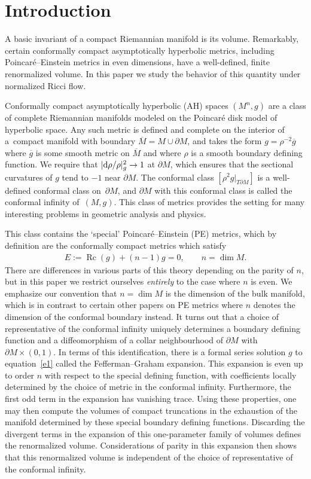 \documentclass[pdftex]{sigma}
\numberwithin{equation}{section}
\newcommand{\del}{\partial}
\newcommand{\gbar}{\overline{g}}
\newcommand{\Mbar}{\overline{M}}
\DeclareMathOperator{\Rc}{Rc}
\begin{document}

\section{Introduction}

A basic invariant of a compact Riemannian manifold is its volume. Remarkably, certain conformally compact
asymptotically hyperbolic metrics, including Poincar\'e--Einstein metrics in even dimensions, have a well-defined,
finite renormalized volume. In this paper we study the behavior of this quantity under normalized Ricci flow.

Conformally compact asymptotically hyperbolic (AH) spaces $(M^n, g)$ are a class of complete Riemannian manifolds modeled on the Poincar\'e disk model of hyperbolic space. Any such metric is defined and complete on the interior of a~compact manifold with boundary $\Mbar = M \cup \partial M$, and takes the form $g = \rho^{-2} \gbar$ where $\gbar$ is some smooth metric on $\Mbar$ and where $\rho$ is a smooth boundary defining function. We require that $|{\rm d}\rho/\rho|^2_g \to 1$ at $\partial M$, which ensures that the sectional curvatures of $g$ tend to $-1$ near $\partial M$. The conformal class $[\rho^2 g |_{T\partial M}]$ is a well-defined conformal class on~$\partial M$, and $\del M$ with this conformal class is called the conformal infinity of~$(M,g)$. This class of metrics provides the setting for many interesting problems in geometric analysis and physics.

This class contains the `special' Poincar\'e--Einstein (PE) metrics, which by definition are the conformally compact metrics which satisfy
\begin{gather} \label{e1}
E := \Rc(g) + (n-1)g = 0,\qquad n = \dim M.
\end{gather}
There are differences in various parts of this theory depending on the parity of $n$, but in this paper we restrict ourselves
{\it entirely} to the case where $n$ is even. We emphasize our convention that $n = \dim M$ is the dimension of the bulk manifold,
which is in contrast to certain other papers on PE metrics where $n$ denotes the dimension of the conformal boundary instead.
It turns out that a choice of representative of the conformal infinity uniquely determines a boundary defining function and
a diffeomorphism of a collar neighbourhood of $\partial M$ with $\partial M \times (0,1)$. In terms of this identification,
there is a formal series solution $g$ to equation~\eqref{e1} called the Fefferman--Graham expansion. This expansion is
even up to order $n$ with respect to the special defining function, with coefficients locally determined by the choice of metric
in the conformal infinity. Furthermore, the first odd term in the expansion has vanishing trace. Using these properties,
one may then compute the volumes of compact truncations in the exhaustion of the manifold determined by these special
boundary defining functions. Discarding the divergent terms in the expansion of this one-parameter family of volumes
defines the renormalized volume. Considerations of parity in this expansion then shows that this renormalized volume
is independent of the choice of representative of the conformal infinity.
\end{document}
